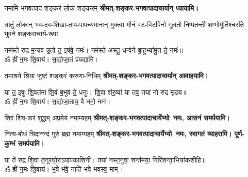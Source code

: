 \sankalpa{}

\vighneshvaraYathasthanam





\renewcommand{\devaName}{गुरु}








\begin{center}


\renewcommand{\devaName}{श्रीमत्-शङ्कर-भगवत्पादाचार्याः}

\begingroup
{}
{नमामि भगवत्पाद-शङ्करं लोक-शङ्करम्}
\textbf{श्रीमत्-शङ्कर-भगवत्पादाचार्यान् ध्यायामि।}
\medskip

{त्रातुं लोकान् भव-दव-शिखा-ताप-पापच्यमानान्}
{मुक्त्वा मौनं वट-विटपिनो मूलतो निष्पतन्ती}
{शम्भोर्मूर्तिश्चरति भुवने शङ्कराचार्य-रूपा}

नम॑स्ते रुद्र म॒न्यव॑ उ॒तो त॒ इष॑वे॒ नमः॑। नम॑स्ते अस्तु॒ धन्व॑ने बा॒हुभ्या॑मु॒त ते॒ नमः॑॥\\
ॐ ह्रीं न॒मः शि॒वाय॑। स॒द्योजा॒तं प्र॑पद्यामि।

{तमाश्रये श्रिया जुष्टं शङ्करं करुणा-निधिम्}
\textbf{श्रीमत्-शङ्कर-भगवत्पादाचार्यान् आवाहयामि।}
\medskip

या त॒ इषुः॑ शि॒वत॑मा शि॒वं ब॒भूव॑ ते॒ धनुः॑। शि॒वा श॑र॒व्या॑ या तव॒ तया॑ नो रुद्र मृडय॥\\
ॐ ह्रीं न॒मः शि॒वाय॑। स॒द्योजा॒ताय॒ वै नमो॒ नमः॑।

{शिवं शिव-करं शुद्धम् अप्रमेयं नमाम्यहम्}
\textbf{श्रीमत्-शङ्कर-भगवत्पादाचार्येभ्यो~नमः, आसनं समर्पयामि।}
\medskip

{नित्य-बोधं चिदानन्दं गुरुं ब्रह्म नमाम्यहम्}
\textbf{श्रीमत्-शङ्कर-भगवत्पादाचार्येभ्यो~नमः, स्वागतं व्याहरामि। पूर्ण-कुम्भं समर्पयामि।}
\medskip

या ते॑ रुद्र शि॒वा त॒नूरघो॒राऽपा॑पकाशिनी। तया॑ नस्त॒नुवा॒ शन्त॑मया॒ गिरि॑शन्ता॒\-भिचा॑कशीहि॥\\
ॐ ह्रीं न॒मः शि॒वाय॑। भ॒वे भ॑वे॒ नाति॑ भवे भवस्व॒ माम्।


\end{center}
